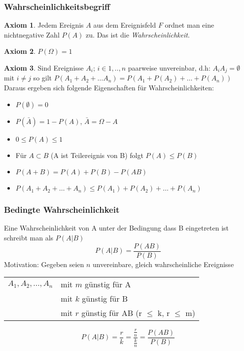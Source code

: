 \documentclass[10pt,a4paper]{article}
\def\firstcircle{(0,0) circle (1.5cm)}
\def\secondcircle{(45:2cm) circle (1.5cm)}
\def\thirdcircle{(0:2cm) circle (1.5cm)}
\theoremstyle{definition}
\newtheorem{axiom}{Axiom}
\begin{document}

\subsubsection{Wahrscheinlichkeitsbegriff}
\begin{axiom}
	Jedem Ereignis $A$ aus dem Ereignisfeld $F$ ordnet man eine nichtnegative Zahl $P(A)$ zu. Das ist die \textit{Wahrscheinlichkeit}.
\end{axiom}
\begin{axiom}
	 $P(\Omega)=1$
\end{axiom}
\begin{axiom}
	Sind Ereignisse $A_i$; $i\in {1,..,n}$ paarweise unvereinbar, d.h: $A_i A_j = \emptyset$ mit $i \neq j $ so gilt $P(A_1+A_2+ \ldots A_n) = P(A_1+P(A_2)+\ldots+P(A_n) )$ Daraus ergeben sich folgende Eigenschaften für Wahrscheinlichkeiten:
	\begin{itemize}
		\item $P(\emptyset)= 0$
		\item $P(\bar{A}) = 1 - P(A)$, $\bar{A} = \Omega -A$
		\item $ 0 \leq P(A) \leq 1$
		\item Für $A \subset B$ (A ist Teilereignis von B) folgt $P(A) \leq P(B)$
		\item $P(A+B) = P(A)+P(B)-P(AB)$
		\item  $P(A_1 + A_2+ \ldots +A_n) \leq P(A_1) + P(A_2)+ \ldots+P(A_n)$
	\end{itemize} 	
\end{axiom}
 
\subsubsection{Bedingte Wahrscheinlichkeit}
Eine Wahrscheinlichkeit von A unter der Bedingung dass B eingetreten ist schreibt man als $P(A|B)$
\[P(A|B) = \frac{P(AB)}{P(B)}\]
Motivation: Gegeben seien $n$ unvereinbare, gleich wahrscheinliche Ereignisse \\
\begin{tabular}{ll}
  $A_1,A_2,...,A_n$ & mit $m$ günstig für A \\
 & mit $k$ günstig für B \\ 
 & mit $r$ günstig für AB (r $\leq$ k, r $\leq$ m) \\ 
\end{tabular}
\[ P(A|B)=\frac{r}{k}=\frac{\frac{r}{n}}{\frac{k}{n}}=\frac{P(AB)}{P(B)} \]
\end{document}
